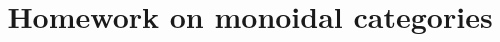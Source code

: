 \documentclass[11pt]{article}
\theoremstyle{plain}
\theoremstyle{definition}
\theoremstyle{remark}
\begin{document}
\title{Homework on monoidal categories}
\maketitle
\end{document}
